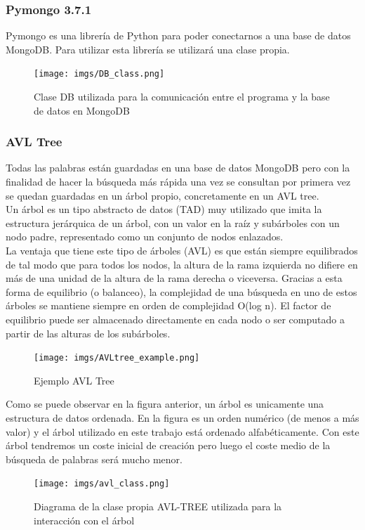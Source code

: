 \documentclass[../all.tex]{subfiles}
\begin{document}
    \subsubsection{Pymongo 3.7.1}
        Pymongo es una librería de Python para poder conectarnos a una base de datos MongoDB.
        Para utilizar esta librería se utilizará una clase propia\cite{PyMongo}.
        \begin{figure}[H]
        	\centering
        	\texttt{[image: imgs/DB\_class.png]}
        	\caption{Clase DB utilizada para la comunicación entre el programa y la base de datos en MongoDB}
        \end{figure}
        
    \subsubsection{AVL Tree}
        
    	Todas las palabras están guardadas en una base de datos MongoDB pero con la finalidad de hacer la búsqueda más rápida una vez se consultan por primera vez se quedan guardadas en un árbol propio, concretamente en un AVL tree. \\
    	
    	Un árbol es un tipo abstracto de datos (TAD) muy utilizado que imita la estructura jerárquica de un árbol, con un valor en la raíz y subárboles con un nodo padre, representado como un conjunto de nodos enlazados.\\
   
    	La ventaja que tiene este tipo de árboles (AVL) es que están siempre equilibrados de tal modo que para todos los nodos, la altura de la rama izquierda no difiere en más de una unidad de la altura de la rama derecha o viceversa. Gracias a esta forma de equilibrio (o balanceo), la complejidad de una búsqueda en uno de estos árboles se mantiene siempre en orden de complejidad O(log n). El factor de equilibrio puede ser almacenado directamente en cada nodo o ser computado a partir de las alturas de los subárboles.\\
    	
    	\begin{figure}[H]
    		\centering
    		\texttt{[image: imgs/AVLtree\_example.png]}
    		\caption{Ejemplo AVL Tree}
    	\end{figure}
    	
    	Como se puede observar en la figura anterior, un árbol es unicamente una estructura de datos ordenada. En la figura es un orden numérico (de menos a más valor)  y el árbol utilizado en este trabajo está ordenado alfabéticamente. Con este árbol tendremos un coste inicial de creación pero luego el coste medio de la búsqueda de palabras será mucho menor.
    	\begin{figure}[H]
    		\centering
    		\texttt{[image: imgs/avl\_class.png]}
    		\caption{Diagrama de la clase propia AVL-TREE utilizada para la interacción con el árbol}
    	\end{figure}
    
\end{document}
